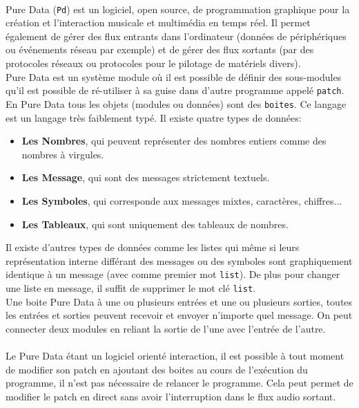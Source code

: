 \documentclass[a4paper, titlepage, oneside, 12pt]{article}%
\begin{document}
\paragraph{}
Pure Data (\texttt{Pd}) est un logiciel, open source, de programmation graphique pour la création et l’interaction musicale et multimédia en temps réel. Il permet également de gérer des flux entrants dans l'ordinateur (données de périphériques ou événements réseau par exemple) et de gérer des flux sortants (par des protocoles réseaux ou protocoles pour le pilotage de matériels divers).\\
Pure Data est un système module où il est possible de définir des sous-modules qu'il est possible de ré-utiliser à sa guise dans d'autre programme appelé \texttt{patch}.\\
En Pure Data tous les objets (modules ou données) sont des \texttt{boites}.
Ce langage est un langage très faiblement typé. Il existe quatre types de données:\\
\begin{itemize}
\item \textbf{Les Nombres}, qui peuvent représenter des nombres entiers comme des nombres à virgules.
\item \textbf{Les Message}, qui sont des messages strictement textuels.
\item \textbf{Les Symboles}, qui corresponde aux messages mixtes, caractères, chiffres...
\item \textbf{Les Tableaux}, qui sont uniquement des tableaux de nombres.
\end{itemize}
Il existe d'autres types de données comme les listes qui même si leurs représentation interne différant des messages ou des symboles sont graphiquement identique à un message (avec comme premier mot \texttt{list}). De plus pour changer une liste en message, il suffit de supprimer le mot clé \texttt{list}.\\
Une boite Pure Data à une ou plusieurs entrées et une ou plusieurs sorties, toutes les entrées et sorties peuvent recevoir et envoyer n'importe quel message. On peut connecter deux modules en reliant la sortie de l'une avec l'entrée de l'autre.


\paragraph{}
Le Pure Data étant un logiciel orienté interaction, il est possible à tout moment de modifier son patch en ajoutant des boites au cours de l’exécution du programme, il n'est pas nécessaire de relancer le programme. Cela peut permet de modifier le patch en direct sans avoir l’interruption dans le flux audio sortant.
\end{document}
